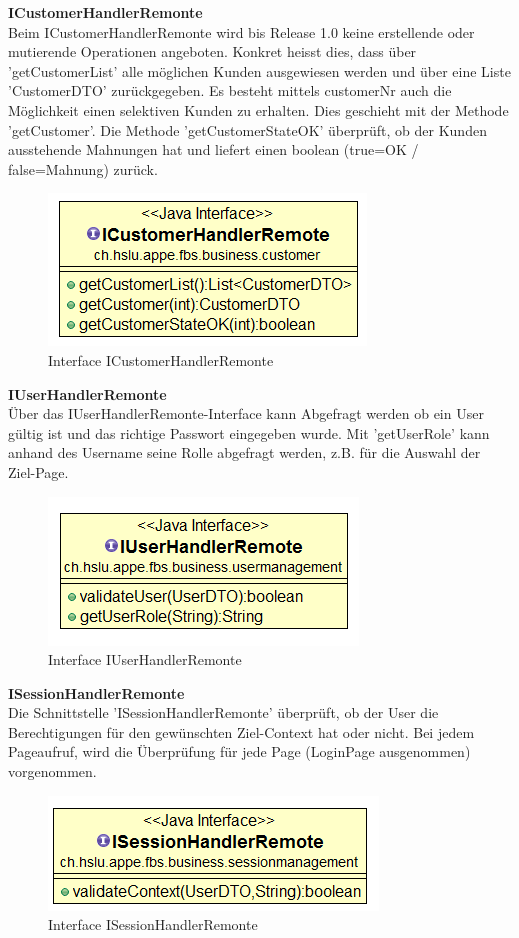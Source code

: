 \textbf{ICustomerHandlerRemonte}\\
Beim ICustomerHandlerRemonte wird bis Release 1.0 keine erstellende oder mutierende Operationen angeboten. Konkret heisst dies, dass über 'getCustomerList' alle möglichen Kunden ausgewiesen werden und über eine Liste 'CustomerDTO' zurückgegeben. Es besteht mittels customerNr auch die Möglichkeit einen selektiven Kunden zu erhalten. Dies geschieht mit der Methode 'getCustomer'.
Die Methode 'getCustomerStateOK' überprüft, ob der Kunden ausstehende Mahnungen hat und liefert einen boolean (true=OK / false=Mahnung) zurück.
\begin{figure}[H]
	\includegraphics[width=0.4\linewidth]{Images/ICustomerHandlerRemonte}
	\caption{Interface ICustomerHandlerRemonte}
	\label{fig:if-ICustomerHandler}
\end{figure}

\textbf{IUserHandlerRemonte}\\
Über das IUserHandlerRemonte-Interface kann Abgefragt werden ob ein User gültig ist und das richtige Passwort eingegeben wurde. Mit 'getUserRole' kann anhand des Username seine Rolle abgefragt werden, z.B. für die Auswahl der Ziel-Page. 
\begin{figure}[H]
	\includegraphics[width=0.4\linewidth]{Images/IUserHandlerRemonte}
	\caption{Interface IUserHandlerRemonte}
	\label{fig:if-IUserHandlerRemonte}
\end{figure}


\textbf{ISessionHandlerRemonte}\\
Die Schnittstelle 'ISessionHandlerRemonte' überprüft, ob der User die Berechtigungen für den gewünschten Ziel-Context hat oder nicht. Bei jedem Pageaufruf, wird die Überprüfung für jede Page (LoginPage ausgenommen) vorgenommen.
\begin{figure}[H]
	\includegraphics[width=0.5\linewidth]{Images/ISessionHandlerRemonte}
	\caption{Interface ISessionHandlerRemonte}
	\label{fig:if-ISessionHandlerRemonte}
\end{figure}

